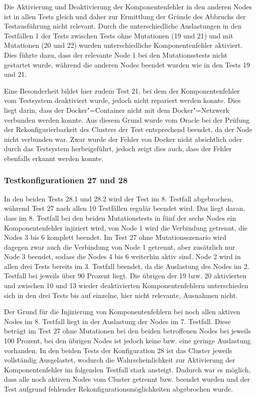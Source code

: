 Die Aktivierung und Deaktivierung der Komponentenfehler in den anderen Nodes ist in allen Tests gleich und daher zur Ermittlung der Gründe des Abbruchs der Testausführung nicht relevant.
Durch die unterschiedliche Auslastungen in den Testfällen 1 der Tests zwischen Tests ohne Mutationen (19 und 21) und mit Mutationen (20 und 22) wurden unterschiedliche Komponentenfehler aktiviert.
Dies führte dazu, dass der relevante Node 1 bei den Mutationsstests nicht gestartet wurde, während die anderen Nodes beendet wurden wie in den Tests 19 und 21.

Eine Besonderheit bildet hier zudem Test 21, bei dem der Komponentenfehler vom Testsystem deaktiviert wurde, jedoch nicht repariert werden konnte.
Dies liegt darin, dass der Docker"=Container nicht mit dem Docker"=Netzwerk verbunden werden konnte.
Aus diesem Grund wurde vom Oracle bei der Prüfung der Rekonfigurierbarkeit des Clusters der Test entsprechend beendet, da der Node nicht verbunden war.
Zwar wurde der Fehler von Docker nicht absichtlich oder durch das Testsystem herbeigeführt, jedoch zeigt dies auch, dass der Fehler ebenfalls erkannt werden konnte.

\subsubsection{Testkonfigurationen 27 und 28}
\label{sec:noReconf2728}

In den beiden Tests 28.1 und 28.2 wird der Test im 8. Testfall abgebrochen, während Test 27 nach allen 10 Testfällen regulär beendet wird.
Das liegt daran, dass im 8. Testfall bei den beiden Mutationstests in fünf der sechs Nodes ein Komponentenfehler injiziert wird, von Node 1 wird die Verbindung getrennt, die Nodes 3 bis 6 komplett beendet.
Im Test 27 ohne Mutationsszenario wird dagegen zwar auch die Verbindung von Node 1 getrennt, aber zusätzlich nur Node 3 beendet, sodass die Nodes 4 bis 6 weiterhin aktiv sind.
Node 2 wird in allen drei Tests bereits im 3. Testfall beendet, da die Auslastung des Nodes im 2. Testfall bei jeweils über 90 Prozent liegt.
Die übrigen der 19 bzw. 20 aktivierten und zwischen 10 und 13 wieder deaktivierten Komponentenfehlern unterschieden sich in den drei Tests bis auf einzelne, hier nicht relevante, Ausnahmen nicht.

Der Grund für die Injizierung von Komponentenfehlern bei noch allen aktiven Nodes im 8. Testfall liegt in der Auslastung der Nodes im 7. Testfall.
Diese beträgt im Test 27 ohne Mutationen bei den beiden betroffenen Nodes bei jeweils 100 Prozent, bei den übrigen Nodes ist jedoch keine bzw. eine geringe Auslastung vorhanden.
In den beiden Tests der Konfiguration 28 ist das Cluster jeweils vollständig Ausgelastet, wodurch die Wahrscheinlichkeit zur Aktivierung der Komponentenfehler im folgenden Testfall stark ansteigt.
Dadurch war es möglich, dass alle noch aktiven Nodes vom Cluster getrennt bzw. beendet wurden und der Test aufgrund fehlender Rekonfigurationsmöglichkeiten abgebrochen wurde.

